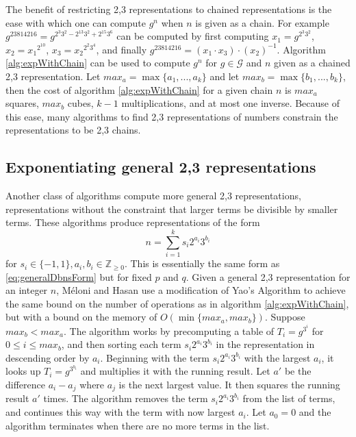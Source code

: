 \documentclass{ucalgthes1}
\theoremstyle{plain}
\theoremstyle{definition}
\newcommand{\ZZgez}{\mathbb{Z}_{\ge 0}}
\begin{document}
The benefit of restricting 2,3 representations to chained representations is the ease with which one can compute $g^n$ when $n$ is given as a chain.  For example $g^{23814216} = g^{2^3 3^2 - 2^{13} 3^2 + 2^{15} 3^6}$ can be computed by first computing $x_1 = g^{2^3 3^2}$, $x_2 = {x_1}^{2^{10}}$, $x_3 = {x_2}^{2^2 3^4}$, and finally $g^{23814216} = \left(x_1 \cdot x_3\right) \cdot \left(x_2\right)^{-1}$.  Algorithm \ref{alg:expWithChain} can be used to compute $g^n$ for $g \in \mathcal G$ and $n$ given as a chained 2,3 representation.  Let $max_a = \max \{a_1,...,a_k\}$ and let $max_b = \max \{b_1,...,b_k\}$, then the cost of algorithm \ref{alg:expWithChain} for a given chain $n$ is $max_a$ squares, $max_b$ cubes, $k-1$ multiplications, and at most one inverse. Because of this ease, many algorithms to find 2,3 representations of numbers constrain the representations to be 2,3 chains.


\bigbreak
\subsection{Exponentiating general 2,3 representations}

Another class of algorithms compute more general 2,3 representations, representations without the constraint that larger terms be divisible by smaller terms.  These algorithms produce representations of the form
\[
	n = \sum_{i=1}^k s_i 2^{a_i} 3^{b_i}
\]
for $s_i \in \{-1, 1\}, a_i, b_i \in \ZZgez$.  This is essentially the same form as \eqref{eq:generalDbnsForm} but for fixed $p$ and $q$.  Given a general 2,3 representation for an integer $n$, M\'{e}loni and Hasan use a modification of Yao's Algorithm \cite[Section 3.2]{Meloni2009} to achieve the same bound on the number of operations as in algorithm \ref{alg:expWithChain}, but with a bound on the memory of $O(\min \{max_a, max_b\})$.  Suppose $max_b < max_a$.  The algorithm works by precomputing a table of $T_i = g^{3^i}$ for $0 \le i \le max_b$, and then sorting each term $s_i2^{a_i}3^{b_i}$ in the representation in descending order by $a_i$.  Beginning with the term $s_i2^{a_i}3^{b_i}$ with the largest $a_i$, it looks up $T_i = g^{3^{b_i}}$ and multiplies it with the running result.  Let $a'$ be the difference $a_i - a_j$ where $a_j$ is the next largest value.  It then squares the running result $a'$ times.  The algorithm removes the term $s_i2^{a_i}3^{b_i}$ from the list of terms, and continues this way with the term with now largest $a_i$.  Let $a_0 = 0$ and the algorithm terminates when there are no more terms in the list.
\end{document}
